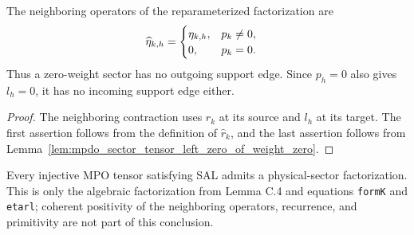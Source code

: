 \begin{lemma}
    \label{thm:mpdo_zero_weight_reparameterized_neighboring_operator}
    \leanok
    The neighboring operators of the reparameterized factorization are
    \begin{align}
        \widehat\eta_{k,h}
         & =
        \begin{cases}
            \eta_{k,h}, & p_k\ne0, \\
            0,          & p_k=0.
        \end{cases}
        \notag
    \end{align}
    Thus a zero-weight sector has no outgoing support edge. Since
    $p_h=0$ also gives $l_h=0$, it has no incoming support edge either.
\end{lemma}

\begin{proof}
    \leanok
    The neighboring contraction uses $r_k$ at its source and $l_h$ at its
    target. The first assertion follows from the definition of
    $\widehat r_k$, and the last assertion follows from
    Lemma~\ref{lem:mpdo_sector_tensor_left_zero_of_weight_zero}.
\end{proof}

\begin{lemma}
    \label{cor:mpdo_sal_raw_physical_sector_factorization}
    \leanok
    Every injective MPO tensor satisfying SAL admits a physical-sector
    factorization. This is only the algebraic factorization from Lemma C.4
    and equations \texttt{formK} and \texttt{etarl}; coherent positivity of
    the neighboring operators, recurrence, and primitivity are not part of
    this conclusion.
\end{lemma}

